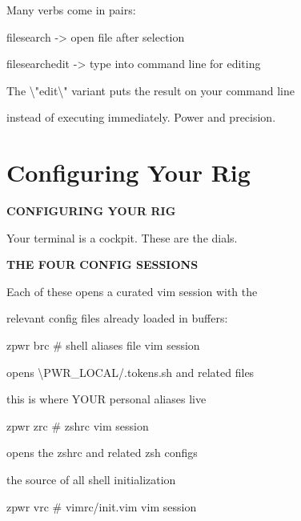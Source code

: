 \documentclass[11pt,a4paper,twoside]{book}
\begin{document}
Many verbs come in pairs:

filesearch      -> open file after selection

filesearchedit  -> type into command line for editing

The \textbackslash{}"edit\textbackslash{}" variant puts the result on your command line

instead of executing immediately. Power and precision.


\vspace{16pt}

\section{Configuring Your Rig}


\vspace{10pt}
{\large\bfseries\color{neoncyan} CONFIGURING YOUR RIG}\vspace{6pt}

Your terminal is a cockpit. These are the dials.


\vspace{12pt}
{\bfseries\color{neonyellow} THE FOUR CONFIG SESSIONS}\vspace{4pt}

\begin{codebox}
Each of these opens a curated vim session with the\\
\end{codebox}

relevant config files already loaded in buffers:

\begin{codebox}
zpwr brc    \# shell aliases file vim session\\
\end{codebox}

opens \textbackslash{}PWR\_LOCAL/.tokens.sh and related files

this is where YOUR personal aliases live

\begin{codebox}
zpwr zrc    \# zshrc vim session\\
\end{codebox}

opens the zshrc and related zsh configs

the source of all shell initialization

\begin{codebox}
zpwr vrc    \# vimrc/init.vim vim session\\
\end{codebox}
\end{document}
